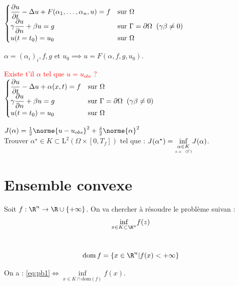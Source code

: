 \documentclass[12pt,a4paper]{article}
\begin{document}
	$\begin{cases}
		\dfrac{\partial u}{\partial t}-\Delta u + F(\alpha_1,\ldots,\alpha_n,u)=f & \text{sur } \Omega\\
		\gamma\dfrac{\partial u}{\partial n}+\beta u = g & \text{sur } \Gamma=\partial\Omega \hspace{.2cm} (\gamma\beta\not=0)\\
		u(t=t_0)=u_0 & \text{sur } \Omega
	\end{cases}$
	
	$\alpha=(\alpha_i)_i,f,g$ et $u_0\implies u=F(\alpha,f,g,u_0)$.
	
	\textcolor{red}{Existe t'il $\alpha$ tel que $u=u_{obs}$ ?}\\
	$\begin{cases}
		\dfrac{\partial u}{\partial t}-\Delta u + \alpha(x,t)=f & \text{sur } \Omega\\
		\gamma\dfrac{\partial u}{\partial n}+\beta u = g & \text{sur } \Gamma=\partial\Omega \hspace{.2cm} (\gamma\beta\not=0)\\
		u(t=t_0)=u_0 & \text{sur } \Omega
	\end{cases}$
	
	$J(\alpha) = \frac12\norme{u-u_{obs}}^2+\frac{\delta}2\norme{\alpha}^2$\\
	Trouver $\alpha^\star \in K \subset \mathrm{L}^2(\Omega\times[0,T_f])$ tel que : $J(\alpha^\star) = \underset{\underset{s.c \hspace{.2cm} (\Gamma)}{\alpha \in K}}{\inf} J(\alpha)$.
	
	\vspace{-.5cm}
	
	\section{Ensemble convexe}
	
	Soit $f : \R^n \to \R\cup\{+\infty\}$. On va chercher à résoudre le problème suivan :
	\begin{equation}\label{eq:pb1}
		\underset{x\in K\subset\R^n}\inf f(z)
	\end{equation}
	
	\begin{defi}$ $\\
		\[
			\mathrm{dom}\,f = \left\{x \in \R^n| f(x)<+\infty\right\}
		\]
	\end{defi}
	
	On a : \eqref{eq:pb1}$\iff \underset{x \in K \cap \mathrm{dom}(f)}\inf f(x)$.
	
\end{document}
